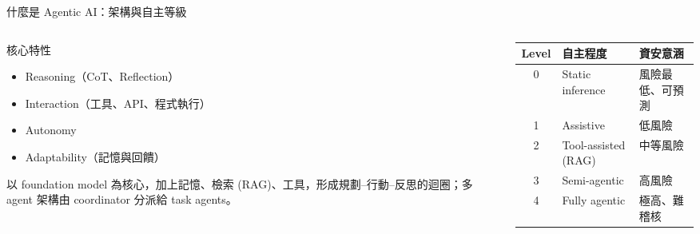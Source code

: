 \documentclass[aspectratio=169]{beamer}
\newcommand{\tabsetup}{\renewcommand{\arraystretch}{1.18}}
\begin{document}
\begin{frame}{什麼是 Agentic AI：架構與自主等級}
    \footnotesize
    \begin{columns}[T]
        \begin{column}{0.42\textwidth}
            \begin{block}{核心特性}
                \begin{itemize}
                    \item Reasoning（CoT、Reflection）
                    \item Interaction（工具、API、程式執行）
                    \item Autonomy
                    \item Adaptability（記憶與回饋）
                \end{itemize}
            \end{block}
            以 foundation model 為核心，加上記憶、檢索 (RAG)、工具，形成規劃--行動--反思的迴圈；多 agent 架構由 coordinator 分派給 task agents。
        \end{column}
        \begin{column}{0.54\textwidth}
            \tabsetup
            \begin{tabular}{@{}c p{2.2cm} p{2.6cm}@{}}
                \toprule
                Level & 自主程度 & 資安意涵 \\
                \midrule
                0 & Static inference & 風險最低、可預測 \\
                1 & Assistive & 低風險 \\
                2 & Tool-assisted (RAG) & 中等風險 \\
                3 & Semi-agentic & 高風險 \\
                4 & Fully agentic & 極高、難稽核 \\
                \bottomrule
            \end{tabular}
        \end{column}
    \end{columns}
\end{frame}
\end{document}
